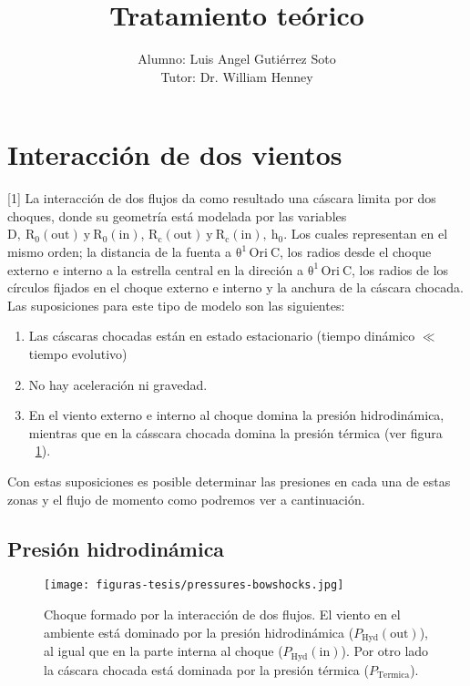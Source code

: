\documentclass{article}
\title{Tratamiento teórico}
\author{
  Alumno: Luis Angel Gutiérrez Soto\\
  Tutor: Dr. William Henney
}
\newcommand\thC{\ensuremath{\mathrm{\theta^1\,Ori~C}}}
\newcommand\Out{\ensuremath{\mathrm{out}}}
\newcommand\In{\ensuremath{\mathrm{in}}}
\begin{document}
\maketitle

\section{Interacción de dos vientos}
\label{sec:interaction}
[1]
La interacción de dos flujos da como resultado una cáscara limita por dos choques, donde su  geometría está modelada por las variables \(\mathrm{D,~R_{0}(\Out{})~ y ~R_{0}(\In{})}\), \(\mathrm{ R_{c}(\Out{})~y~R_{c}(\In{}),~h_{0}}\). Los cuales representan en el mismo orden; la distancia de la fuenta a \thC{}, los radios desde el choque externo e interno a la estrella central en la direción a \thC{}, los radios de los círculos fijados en el choque externo e interno y la anchura de la cáscara chocada. Las suposiciones para este tipo de modelo son las siguientes:

\begin{enumerate}
\item Las cáscaras chocadas están en estado estacionario (tiempo dinámico \(\ll\) tiempo evolutivo)
\item No hay aceleración ni gravedad.
\item En el viento externo e interno al choque domina la presión hidrodinámica, mientras que en la cásscara chocada domina la presión térmica (ver figura ~\ref{fig:interaction}).  
\end{enumerate}

Con estas suposiciones es posible determinar las presiones en cada una de estas zonas y el flujo de momento como podremos ver a cantinuación.

\subsection{Presión hidrodinámica}
\label{sec:pressure}

\begin{figure}
  \centering
  \texttt{[image: figuras-tesis/pressures-bowshocks.jpg]}
  \caption{Choque formado por la interacción de dos flujos. El viento en el ambiente está dominado por la presión hidrodinámica  (\(P_{\text{Hyd}}(\Out{})\)), al igual que en la parte interna al choque (\(P_{\text{Hyd}}(\In{})\)). Por otro lado la cáscara chocada está dominada por la presión térmica (\(P_{\text{Termica}}\)).}
  \label{fig:interaction}
\end{figure}
\end{document}
